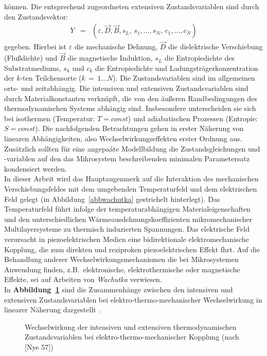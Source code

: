 können. Die entsprechend zugeordneten extensiven Zustandsvariablen sind
durch den Zustandsvektor:
%
\begin{eqnarray}
Y & = & \left ( \varepsilon , \vec{D}, \vec{B}, s_{L}, \, s_{1}, \ldots
, s_{N}, \, c_{1}, \ldots , c_{N} \right )
\end{eqnarray}
%
gegeben. Hierbei ist $\varepsilon$ die mechanische Dehnung, $\vec{D}$
die dielektrische Verschiebung (Flußdichte) und $\vec{B}$ die
magnetische Induktion, $s_{L}$ die Entropiedichte des Substratmediums,
$s_{k}$ und $c_{k}$ die Entropiedichte
und Ladungsträgerkonzentration der $k$-ten Teilchensorte
($k \, = \, 1 \ldots N$). Die Zustandsvariablen sind im allgemeinen orts-
und zeitabhängig. Die intensiven und extensiven Zustandsvariablen sind durch
Materialkonstanten verknüpft, die von den äußeren Randbedingungen des
thermodynamischen Systems abhängig sind. Insbesondere unterscheiden sie
sich bei isothermen (Temperatur: $T = const$) und adiabatischen Prozessen
(Entropie: $S = const$).
Die nachfolgenden Betrachtungen gehen in erster Näherung von linearen
Abhängigkeiten, also Wechselwirkungseffekten erster Ordnung aus.
Zusätzlich sollten für eine angepaáte Modellbildung die Zustandsgleichungen
und -variablen auf den das Mikrosystem beschreibenden minimalen
Parametersatz kondensiert werden.\\
In dieser Arbeit wird das Hauptaugenmerk auf die Interaktion des
mechanischen Verschiebungsfeldes mit dem umgebenden Temperaturfeld und
dem elektrischen Feld gelegt (in Abbildung~\ref{abbwachutka}
gestrichelt hinterlegt). Das Temperaturfeld führt infolge der
temperaturabhängigen Materialeigenschaften und den unterschiedlichen
Wärmeausdehnungskoeffizienten mikromechanischer Multilayersysteme zu
thermisch induzierten Spannungen.  Das elektrische Feld verursacht in
piezoelektrischen Medien eine bidirektionale elektromechanische
Kopplung, die zum direkten und reziproken piezoelektrischen Effekt
fhrt. Auf die Behandlung anderer Wechselwirkungsmechanismen die bei
Mikrosystemen Anwendung finden, z.B.\ elektronische, elektrothermische
oder magnetische Effekte, sei auf Arbeiten von {\sl Wachutka}
\cite{Wac90, Wac91} verwiesen.\\
In {\bf Abbildung~\ref{abbnye}} sind die Zusammenhänge zwischen den
intensiven und extensiven Zustandsvariablen bei
elektro-thermo-mechanischer Wechselwirkung in linearer Näherung
dargestellt \cite{Nye57}.
\begin{figure}[htb]
\begin{center}

\setabbzz
\end{center}
\caption{\label{abbnye}
 Wechselwirkung der intensiven und extensiven thermodynamischen
 Zustandsvariablen bei elektro-thermo-mechanischer Kopplung (nach
 [Nye 57])}
\end{figure}
